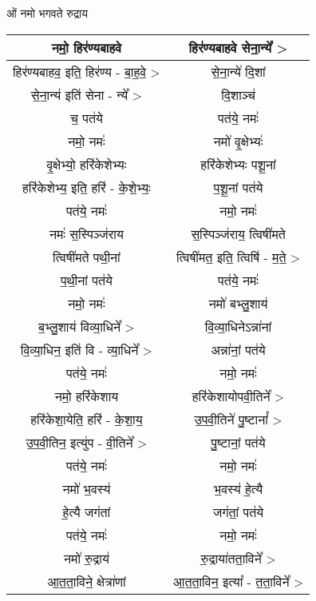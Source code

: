 \subsection{}
ओं नमो भगवते रुद्राय
{\centering
\begin{longtable}{|c|c|}
\hline
नमो॒ हिर॑ण्यबाहवे            & हिर॑ण्यबाहवे सेना॒न्ये᳚ >\\
\hline
हिर॑ण्यबाहव॒ इति॒ हिर॑ण्य - बा॒ह॒वे॒ >   & से॒ना॒न्ये॑ दि॒शां\\
\hline
से॒ना॒न्य॑ इति॑ सेना - न्ये᳚ >     & दि॒शाञ्च॑\\
\hline
च॒ पत॑ये                    & पत॑ये॒ नमः॑\\
\hline
नमो॒ नमः॑                  & नमो॑ वृ॒क्षेभ्यः॑\\
\hline
वृ॒क्षेभ्यो॒ हरि॑केशेभ्यः          & हरि॑केशेभ्यः पशू॒नां\\
\hline
हरि॑केशेभ्य॒ इति॒ हरि॑ - के॒शे॒भ्यः॒  & प॒शू॒नां पत॑ये\\
\hline
पत॑ये॒ नमः॑                  & नमो॒ नमः॑\\
\hline
नमः॑ स॒स्पिञ्ज॑राय            & स॒स्पिञ्ज॑राय॒ त्विषी॑मते\\
\hline
त्विषी॑मते पथी॒नां            & त्विषी॑मत॒ इति॒ त्विषि॑ - म॒ते॒ >\\
\hline
प॒थी॒नां पत॑ये                & पत॑ये॒ नमः॑\\
\hline
नमो॒ नमः॑                  & नमो॑ बभ्लु॒शाय॑\\
\hline
ब॒भ्लु॒शाय॑ विव्या॒धिने᳚ >        & वि॒व्या॒धिनेऽन्ना॑नां\\
\hline
वि॒व्या॒धिन॒ इति॑ वि - व्या॒धिने᳚ > & अन्ना॑नां॒ पत॑ये\\
\hline
पत॑ये॒ नमः॑                  & नमो॒ नमः॑\\
\hline
नमो॒ हरि॑केशाय              & हरि॑केशायोपवी॒तिने᳚ >\\
\hline
हरि॑केशा॒येति॒ हरि॑ - के॒शा॒य॒     & उ॒प॒वी॒तिने॑ पु॒ष्टानां᳚ >\\
\hline
उ॒प॒वी॒तिन॒ इत्यु॑प - वी॒तिने᳚ >   & पु॒ष्टानां॒ पत॑ये\\
\hline
पत॑ये॒ नमः॑                  & नमो॒ नमः॑\\
\hline
नमो॑ भ॒वस्य॑                 & भ॒वस्य॑ हे॒त्यै\\
\hline
हे॒त्यै जग॑तां                 & जग॑तां॒ पत॑ये\\
\hline
पत॑ये॒ नमः॑                  & नमो॒ नमः॑\\
\hline
नमो॑ रु॒द्राय॑                & रु॒द्राया॑तता॒विने᳚ >\\
\hline
आ॒त॒ता॒विने॒ क्षेत्रा॑णां          & आ॒त॒ता॒विन॒ इत्या᳚ - त॒ता॒विने᳚ >\\

\end{longtable}}
